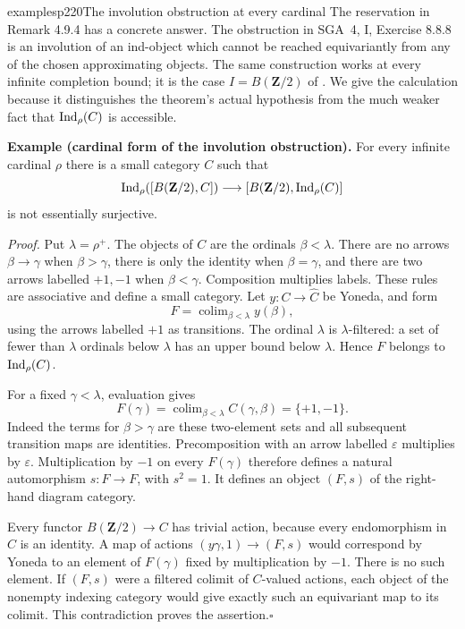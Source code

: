 \begin{dcomment}{examples}{p220}{The involution obstruction at every cardinal}
The reservation in Remark 4.9.4 has a concrete answer.  The obstruction in SGA~4, I, Exercise 8.8.8 is an involution of an ind-object which cannot be reached equivariantly from any of the chosen approximating objects.  The same construction works at every infinite completion bound; it is the case $I=B(\mathbf Z/2)$ of \citet[Example 1.4, Construction 3.1 and Section 3.2]{Henry2025Ind}.  We give the calculation because it distinguishes the theorem's actual hypothesis from the much weaker fact that $\mathrm{Ind}_\rho(C)$ is accessible.

\textbf{Example (cardinal form of the involution obstruction).}
For every infinite cardinal $\rho$ there is a small category $C$ such that
\[
 \mathrm{Ind}_\rho([B(\mathbf Z/2),C])\longrightarrow
 [B(\mathbf Z/2),\mathrm{Ind}_\rho(C)]
\]
is not essentially surjective.

\textit{Proof.} Put $\lambda=\rho^+$.  The objects of $C$ are the ordinals $\beta<\lambda$.  There are no arrows $\beta\to\gamma$ when $\beta>\gamma$, there is only the identity when $\beta=\gamma$, and there are two arrows labelled $+1,-1$ when $\beta<\gamma$.  Composition multiplies labels.  These rules are associative and define a small category.  Let $y:C\to\widehat C$ be Yoneda, and form
\[
 F=\mathop{\operatorname{colim}}_{\beta<\lambda}y(\beta),
\]
using the arrows labelled $+1$ as transitions.  The ordinal $\lambda$ is $\lambda$-filtered: a set of fewer than $\lambda$ ordinals below $\lambda$ has an upper bound below $\lambda$.  Hence $F$ belongs to $\mathrm{Ind}_\rho(C)$.

For a fixed $\gamma<\lambda$, evaluation gives
\[
 F(\gamma)=\mathop{\operatorname{colim}}_{\beta<\lambda}
            C(\gamma,\beta)=\{+1,-1\}.
\]
Indeed the terms for $\beta>\gamma$ are these two-element sets and all subsequent transition maps are identities.  Precomposition with an arrow labelled $\varepsilon$ multiplies by $\varepsilon$.  Multiplication by $-1$ on every $F(\gamma)$ therefore defines a natural automorphism $s:F\to F$, with $s^2=1$.  It defines an object $(F,s)$ of the right-hand diagram category.

Every functor $B(\mathbf Z/2)\to C$ has trivial action, because every endomorphism in $C$ is an identity.  A map of actions $(y\gamma,1)\to(F,s)$ would correspond by Yoneda to an element of $F(\gamma)$ fixed by multiplication by $-1$.  There is no such element.  If $(F,s)$ were a filtered colimit of $C$-valued actions, each object of the nonempty indexing category would give exactly such an equivariant map to its colimit.  This contradiction proves the assertion.\hfill$\square$


\end{dcomment}
